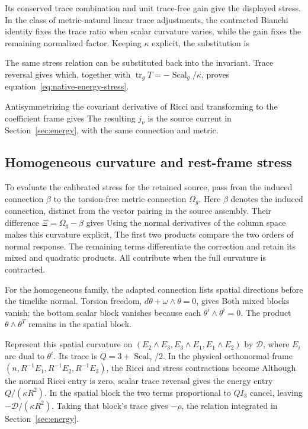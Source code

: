 Its conserved trace combination and unit trace-free gain give the displayed stress. In the class of metric-natural linear trace adjustments, the contracted Bianchi identity fixes the trace ratio when scalar curvature varies, while the gain fixes the remaining normalized factor. Keeping $\kappa$ explicit, the substitution is
\EnergyStressSubstitutionDisplay

The same stress relation can be substituted back into the invariant. Trace reversal gives
\NativeTraceReversalNormDisplay
which, together with $\operatorname{tr}_gT=-\operatorname{Scal}_g/\kappa$, proves equation~\eqref{eq:native-energy-stress}.

Antisymmetrizing the covariant derivative of Ricci and transforming to the coefficient frame gives
\NativeCurrentSourceDisplay
The resulting $j_\nu$ is the source current in Section~\ref{sec:energy}, with the same connection and metric.

\subsection{Homogeneous curvature and rest-frame stress}
\label{app:source-stress}
To evaluate the calibrated stress for the retained source, pass from the induced connection $\beta$ to the torsion-free metric connection $\Omega_g$. Here $\beta$ denotes the induced connection, distinct from the vector pairing in the source assembly. Their difference $\Xi=\Omega_g-\beta$ gives
\SourceCurvatureExpansionDisplay
Using the normal derivatives of the column space makes this curvature explicit,
\SourceOrderedCurvatureDisplay
The first two products compare the two orders of normal response. The remaining terms differentiate the correction and retain its mixed and quadratic products. All contribute when the full curvature is contracted.

For the homogeneous family, the adapted connection lists spatial directions before the timelike normal. Torsion freedom, $d\theta+\omega\wedge\theta=0$, gives
\SourceCurvatureReductionDisplay
Both mixed blocks vanish; the bottom scalar block vanishes because each $\theta^i\wedge\theta^i=0$. The product $\theta\wedge\theta^T$ remains in the spatial block.

Represent this spatial curvature on $(E_2\wedge E_3,E_3\wedge E_1,E_1\wedge E_2)$ by $\mathcal D$, where $E_i$ are dual to $\theta^i$. Its trace is $Q=3+\operatorname{Scal}_\gamma/2$. In the physical orthonormal frame $(n,R^{-1}E_1,R^{-1}E_2,R^{-1}E_3)$, the Ricci and stress contractions become
\SourceRicciStressReductionDisplay
Although the normal Ricci entry is zero, scalar trace reversal gives the energy entry $Q/(\kappa R^2)$. In the spatial block the two terms proportional to $QI_3$ cancel, leaving $-\mathcal D/(\kappa R^2)$. Taking that block's trace gives $-\rho$, the relation integrated in Section~\ref{sec:energy}.

